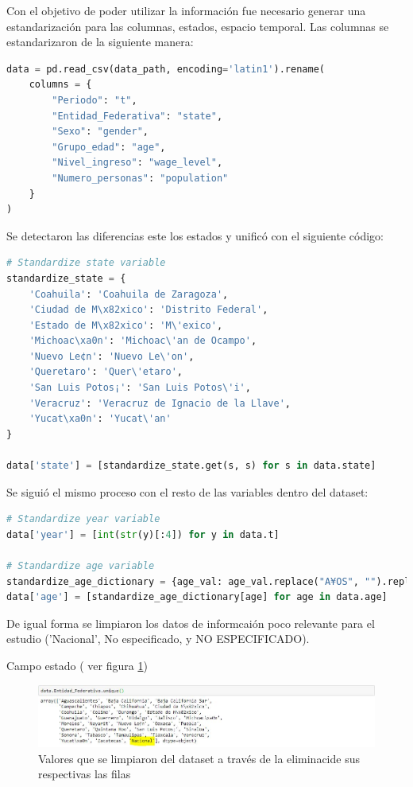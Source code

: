 Con el objetivo de poder utilizar la informaci\'on fue necesario generar una estandarizaci\'on para las columnas, estados, espacio temporal. 
Las columnas se estandarizaron de la siguiente manera:


\begin{lstlisting}[language=Python]
data = pd.read_csv(data_path, encoding='latin1').rename(
    columns = {
        "Periodo": "t",
        "Entidad_Federativa": "state",
        "Sexo": "gender",
        "Grupo_edad": "age",
        "Nivel_ingreso": "wage_level",
        "Numero_personas": "population"
    }
)
\end{lstlisting}

Se detectaron las diferencias este los estados y unific\'o con el siguiente c\'odigo:

\begin{lstlisting}[language=Python]
# Standardize state variable
standardize_state = {
    'Coahuila': 'Coahuila de Zaragoza',
    'Ciudad de M\x82xico': 'Distrito Federal',
    'Estado de M\x82xico': 'M\'exico', 
    'Michoac\xa0n': 'Michoac\'an de Ocampo', 
    'Nuevo Le¢n': 'Nuevo Le\'on',
    'Queretaro': 'Quer\'etaro', 
    'San Luis Potos¡': 'San Luis Potos\'i', 
    'Veracruz': 'Veracruz de Ignacio de la Llave',
    'Yucat\xa0n': 'Yucat\'an'
}

data['state'] = [standardize_state.get(s, s) for s in data.state]
\end{lstlisting}

Se sigui\'o el mismo proceso con el resto de las variables dentro del dataset:
\begin{lstlisting}[language=Python]
# Standardize year variable
data['year'] = [int(str(y)[:4]) for y in data.t]

# Standardize age variable
standardize_age_dictionary = {age_val: age_val.replace("A¥OS", "").replace(" ", "") for age_val in data.age.unique()} 
data['age'] = [standardize_age_dictionary[age] for age in data.age]
\end{lstlisting}

De igual forma se limpiaron los datos de informcai\'on poco relevante para el estudio ('Nacional', No especificado, y NO ESPECIFICADO).

Campo estado ( ver figura \ref{fig:stateUnique_Standarization})

\begin{figure}[h!]
	\centering
	\includegraphics[width=1\linewidth]{Figure/stateUnique_Standarization.JPG}
	\caption{Valores que se limpiaron del dataset a trav\'es de la eliminaci\on de sus respectivas las filas}
	\label{fig:stateUnique_Standarization}
\end{figure}

